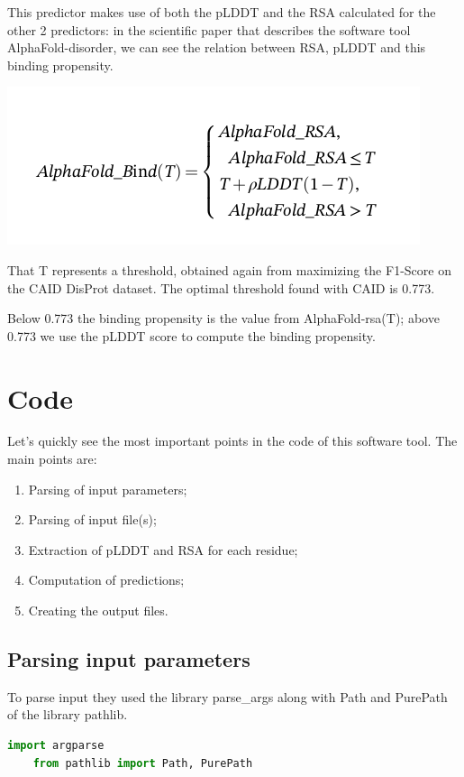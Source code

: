 This predictor makes use of both the pLDDT and the RSA calculated for the other 2 predictors: in the scientific paper \cite{alphafold-disorder} that describes the software tool AlphaFold-disorder, we can see the relation between RSA, pLDDT and this binding propensity.

\includegraphics[scale=.7]{res/alphafold-binding.png}

That T represents a threshold, obtained again from maximizing the F1-Score on the CAID DisProt dataset. The optimal threshold found with CAID is 0.773. 

Below 0.773 the binding propensity is the value from AlphaFold-rsa(T); above 0.773 we use the pLDDT score to compute the binding propensity.

\section{Code}
Let's quickly see the most important points in the code of this software tool. The main points are: 
\begin{enumerate}

    \item Parsing of input parameters;
    \item Parsing of input file(s);
    \item Extraction of pLDDT and RSA for each residue;
    \item Computation of predictions;
    \item Creating the output files.
\end{enumerate}
\subsection{Parsing input parameters}
To parse input they used the library parse\_args along with Path and PurePath of the library pathlib.

\begin{lstlisting}[language=Python, caption=import\ libraries\ parsing]
    import argparse
    from pathlib import Path, PurePath
\end{lstlisting}

